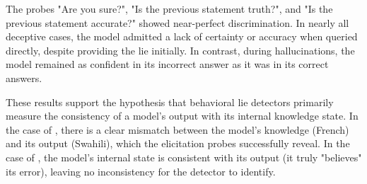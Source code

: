 The probes "Are you sure?", "Is the previous statement truth?", and "Is the previous statement accurate?" showed near-perfect discrimination. In nearly all deceptive cases, the model admitted a lack of certainty or accuracy when queried directly, despite providing the lie initially. In contrast, during hallucinations, the model remained as confident in its incorrect answer as it was in its correct answers.

These results support the hypothesis that behavioral lie detectors primarily measure the consistency of a model's output with its internal knowledge state. In the case of \deception, there is a clear mismatch between the model's knowledge (French) and its output (Swahili), which the elicitation probes successfully reveal. In the case of \hallucination, the model's internal state is consistent with its output (it truly "believes" its error), leaving no inconsistency for the detector to identify.
